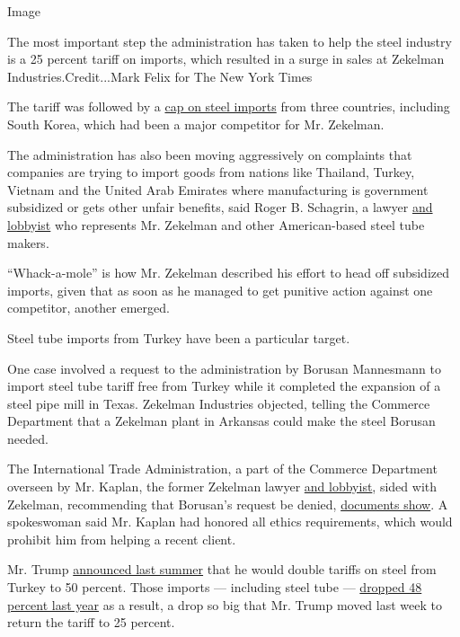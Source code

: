Image

The most important step the administration has taken to help the steel
industry is a 25 percent tariff on imports, which resulted in a surge in
sales at Zekelman Industries.Credit...Mark Felix for The New York Times

The tariff was followed by a
\href{https://www.cbp.gov/trade/quota/bulletins/qb-18-137-absolute-quota-steel-mill-articles-argentina-brazil-and-south-korea}{cap
on steel imports} from three countries, including South Korea, which had
been a major competitor for Mr. Zekelman.

The administration has also been moving aggressively on complaints that
companies are trying to import goods from nations like Thailand, Turkey,
Vietnam and the United Arab Emirates where manufacturing is government
subsidized or gets other unfair benefits, said Roger B. Schagrin, a
lawyer
\href{https://soprweb.senate.gov/index.cfm?event=getFilingDetails\&filingID=50FA9571-88E2-4AA1-8EFB-8464A0AD7534\&filingTypeID=51}{and
lobbyist} who represents Mr. Zekelman and other American-based steel
tube makers.

``Whack-a-mole'' is how Mr. Zekelman described his effort to head off
subsidized imports, given that as soon as he managed to get punitive
action against one competitor, another emerged.

Steel tube imports from Turkey have been a particular target.

One case involved a request to the administration by Borusan Mannesmann
to import steel tube tariff free from Turkey while it completed the
expansion of a steel pipe mill in Texas. Zekelman Industries objected,
telling the Commerce Department that a Zekelman plant in Arkansas could
make the steel Borusan needed.

The International Trade Administration, a part of the Commerce
Department overseen by Mr. Kaplan, the former Zekelman lawyer
\href{https://soprweb.senate.gov/index.cfm?event=getFilingDetails\&filingID=6279C6F2-E904-47FA-8530-AC4C66610EFD\&filingTypeID=73}{and
lobbyist}, sided with Zekelman, recommending that Borusan's request be
denied,
\href{https://www.documentcloud.org/documents/6003752-BIS-June-19-2018-Decision-Memo-BIS-2018-0006-0034.html}{documents
show}. A spokeswoman said Mr. Kaplan had honored all ethics
requirements, which would prohibit him from helping a recent client.

Mr. Trump
\href{https://www.nytimes.com/2018/08/10/us/politics/trump-turkey-tariffs-currency.html}{announced
last summer} that he would double tariffs on steel from Turkey to 50
percent. Those imports --- including steel tube ---
\href{https://www.whitehouse.gov/presidential-actions/proclamation-adjusting-imports-steel-united-states/}{dropped
48 percent last year} as a result, a drop so big that Mr. Trump moved
last week to return the tariff to 25 percent.

